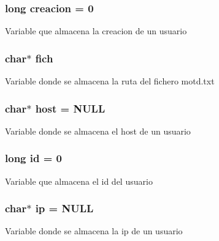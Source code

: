 \subsubsection[{creacion}]{\setlength{\rightskip}{0pt plus 5cm}long creacion = 0}\label{_g-2361-06-_p1-_server_8c_a26292066ca0d17922eadee4161542ab9}
Variable que almacena la creacion de un usuario \hypertarget{_g-2361-06-_p1-_server_8c_a5666511ca3d4a3dc685c6f14c663aed5}{}
\subsubsection[{fich}]{\setlength{\rightskip}{0pt plus 5cm}char$\ast$ fich}\label{_g-2361-06-_p1-_server_8c_a5666511ca3d4a3dc685c6f14c663aed5}
Variable donde se almacena la ruta del fichero motd.\+txt \hypertarget{_g-2361-06-_p1-_server_8c_a1c2046dcb30a629d6d9f45ff8f403f12}{}
\subsubsection[{host}]{\setlength{\rightskip}{0pt plus 5cm}char$\ast$ host = N\+U\+L\+L}\label{_g-2361-06-_p1-_server_8c_a1c2046dcb30a629d6d9f45ff8f403f12}
Variable donde se almacena el host de un usuario \hypertarget{_g-2361-06-_p1-_server_8c_a7350fbd6ad10618f3b750b1f99ca5c3c}{}
\subsubsection[{id}]{\setlength{\rightskip}{0pt plus 5cm}long id = 0}\label{_g-2361-06-_p1-_server_8c_a7350fbd6ad10618f3b750b1f99ca5c3c}
Variable que almacena el id del usuario \hypertarget{_g-2361-06-_p1-_server_8c_afbc356cd0e25d1dbbece7c10fd025fa6}{}
\subsubsection[{ip}]{\setlength{\rightskip}{0pt plus 5cm}char$\ast$ ip = N\+U\+L\+L}\label{_g-2361-06-_p1-_server_8c_afbc356cd0e25d1dbbece7c10fd025fa6}
Variable donde se almacena la ip de un usuario \hypertarget{_g-2361-06-_p1-_server_8c_a5892a9181e6a332f84d27aecd41dcd12}{}
